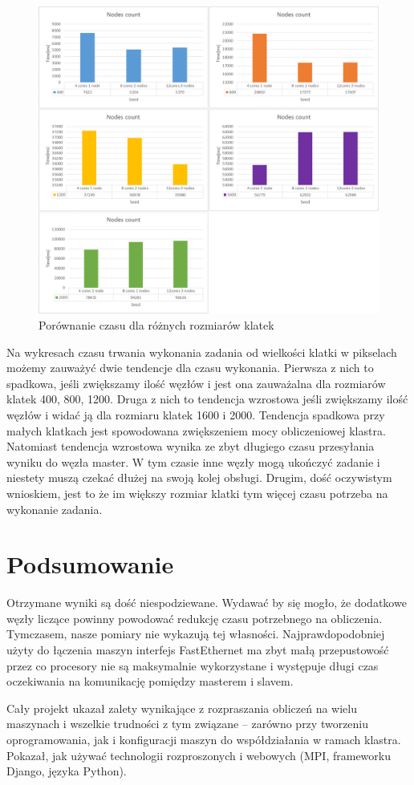 \documentclass[a4paper]{article}
\begin{document}
\begin{figure}[H]
    \centering
    \includegraphics[width=\textwidth]{6.png}
    \caption{Porównanie czasu dla różnych rozmiarów klatek}
    \label{fig:my_frac}
\end{figure}

Na wykresach czasu trwania wykonania zadania od wielkości klatki w pikselach możemy zauważyć dwie tendencje dla czasu wykonania. Pierwsza z nich to spadkowa, jeśli zwiększamy ilość węzłów i jest ona zauważalna dla rozmiarów klatek 400, 800, 1200. Druga z nich to tendencja wzrostowa jeśli zwiększamy ilość węzłów i widać ją dla rozmiaru klatek 1600 i 2000. Tendencja spadkowa przy małych klatkach jest spowodowana zwiększeniem mocy obliczeniowej klastra. Natomiast tendencja wzrostowa wynika ze zbyt długiego czasu przesyłania wyniku do węzła master. W tym czasie inne węzły mogą ukończyć zadanie i niestety muszą czekać dłużej na swoją kolej obsługi. Drugim, dość oczywistym wnioskiem, jest to że im większy rozmiar klatki tym więcej czasu potrzeba na wykonanie zadania.

\newpage

\section{Podsumowanie}
Otrzymane wyniki są dość niespodziewane. Wydawać by się mogło, że dodatkowe węzły liczące powinny powodować redukcję czasu potrzebnego na obliczenia. Tymczasem, nasze pomiary nie wykazują tej własności. Najprawdopodobniej użyty do łączenia maszyn interfejs FastEthernet ma zbyt małą przepustowość przez co procesory nie są maksymalnie wykorzystane i występuje długi czas oczekiwania na komunikację pomiędzy masterem i slavem.

Cały projekt ukazał zalety wynikające z rozpraszania obliczeń na wielu maszynach i wszelkie trudności z tym związane -- zarówno przy tworzeniu oprogramowania, jak i konfiguracji maszyn do współdziałania w ramach klastra. Pokazał, jak używać technologii rozproszonych i webowych (MPI, frameworku Django, języka Python).

\newpage
\listoffigures
{}
\end{document}
